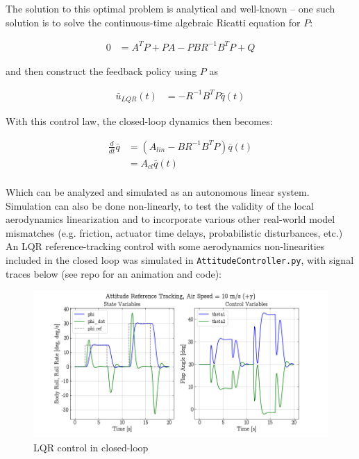 \documentclass[12pt]{article}
\begin{document}
The solution to this optimal problem is analytical and well-known -- one such solution is to solve the continuous-time algebraic Ricatti equation for $P$:

\begin{align*}
0 &= A^T P + PA - PBR^{-1}B^T P + Q
\end{align*}

and then construct the feedback policy using $P$ as

\begin{align*}
\bar{u}_{LQR}(t) &= -R^{-1}B^T P \bar{q}(t)
\end{align*}


With this control law, the closed-loop dynamics then becomes:

\begin{align*}
\frac{d}{dt}\bar{q} &= (A_{lin} - BR^{-1}B^T P) \bar{q}(t) \\
&= A_{cl}\bar{q}(t) \\
\end{align*}

Which can be analyzed and simulated as an autonomous linear system. \\

Simulation can also be done non-linearly, to test the validity of the local aerodynamics linearization and to incorporate various other real-world model mismatches (e.g. friction, actuator time delays, probabilistic disturbances, etc.) \\

An LQR reference-tracking control with some aerodynamics non-linearities included in the closed loop was simulated in \texttt{AttitudeController.py}, with signal traces below (see repo for an animation and code):


\begin{figure}[h]
\centering
\includegraphics[width=.9\linewidth]{../control_figures/attitude_ref_tracking.png}
\caption{LQR control in closed-loop}
\end{figure}
\end{document}
